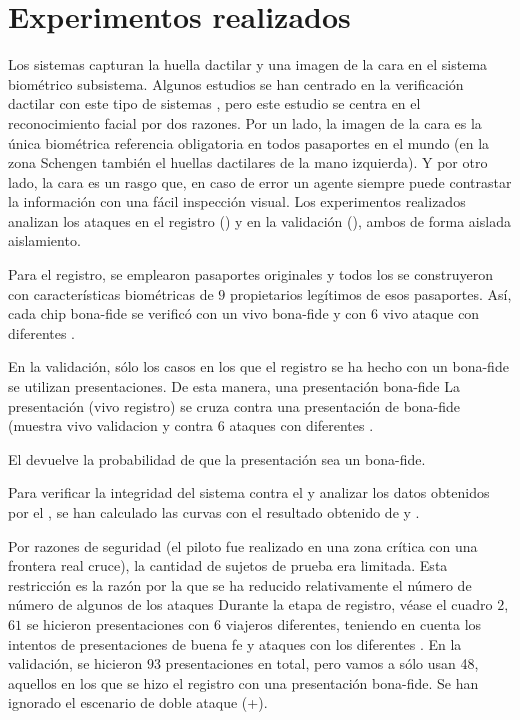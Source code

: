 \section{Experimentos realizados}\label{sec:ExperimentosABC4EU}

Los sistemas  capturan la huella dactilar y una imagen de la cara en el sistema biométrico subsistema. Algunos estudios se han centrado en la verificación dactilar con este tipo de sistemas  \cite{donida2016emerging}, pero este estudio se centra en el reconocimiento facial por dos razones. Por un lado, la imagen de la cara es la única biométrica referencia obligatoria en todos pasaportes en el mundo (en la zona \Gls{Schengen} también el huellas dactilares de la mano izquierda). Y por otro lado, la cara es un rasgo que, en caso de error un agente siempre puede contrastar la información con una fácil inspección visual. Los experimentos realizados analizan los ataques en el registro () y en la validación (), ambos de forma aislada aislamiento.

Para el registro, se emplearon pasaportes originales y todos los  se construyeron con características biométricas de $9$ propietarios legítimos de esos pasaportes. Así, cada \gls{chip bona-fide} se verificó con un \gls{vivo bona-fide} y con $6$ \gls{vivo ataque} con diferentes . 

En la validación, sólo los casos en los que el registro se ha hecho con un \gls{bona-fide} se utilizan presentaciones. De esta manera, una presentación \gls{bona-fide} La presentación (\gls{vivo registro}) se cruza contra una presentación de \gls{bona-fide} (muestra \gls{vivo validacion} y contra 6 ataques con diferentes .

El  devuelve la probabilidad de que la presentación sea un \gls{bona-fide}.

Para verificar la integridad del sistema contra el y analizar los datos obtenidos por el , se han calculado las curvas  con el resultado  obtenido de  y . 

Por razones de seguridad (el piloto fue realizado en una zona crítica con una frontera real cruce), la cantidad de sujetos de prueba era limitada. Esta restricción es la razón por la que se ha reducido relativamente el número de número de algunos de los ataques Durante la etapa de registro, véase el cuadro $2$, $61$ se hicieron presentaciones con $6$ viajeros diferentes, teniendo en cuenta los intentos de presentaciones de buena fe y ataques con los diferentes . En la validación, se hicieron $93$ presentaciones en total, pero vamos a sólo usan 48, aquellos en los que se hizo el registro con una presentación \gls{bona-fide}. Se han ignorado el escenario de doble ataque (+).

